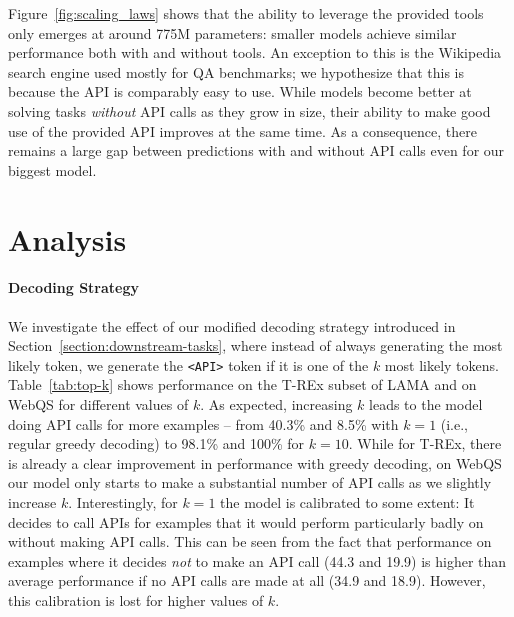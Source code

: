 \documentclass[11pt]{article}
\begin{document}
\begin{CJK*}{UTF8}{gbsn}
Figure~\ref{fig:scaling_laws} shows that the ability to leverage the provided tools only emerges at around 775M parameters: smaller models achieve similar performance both with and without tools. An exception to this is the Wikipedia search engine used mostly for QA benchmarks; we hypothesize that this is because the API is comparably easy to use.
While models become better at solving tasks \emph{without} API calls as they grow in size, their ability to make good use of the provided API improves at the same time. As a consequence, there remains a large gap between predictions with and without API calls even for our biggest model.

\section{Analysis}
\label{section:analysis}

\paragraph{Decoding Strategy}

We investigate the effect of our modified decoding strategy introduced in Section~\ref{section:downstream-tasks}, where instead of always generating the most likely token, we generate the \texttt{<API>} token if it is one of the $k$ most likely tokens. Table~\ref{tab:top-k} shows performance on the T-REx subset of LAMA and on WebQS for different values of $k$. As expected, increasing $k$ leads to the model doing API calls for more examples -- from 40.3\% and 8.5\% with $k = 1$ (i.e., regular greedy decoding) to 98.1\% and 100\% for $k = 10$. While for T-REx, there is already a clear improvement in performance with greedy decoding, on WebQS our model only starts to make a substantial number of API calls as we slightly increase $k$. Interestingly, for $k = 1$ the model is calibrated to some extent: It decides to call APIs for examples that it would perform particularly badly on without making API calls. This can be seen from the fact that performance on examples where it decides \emph{not} to make an API call (44.3 and 19.9) is higher than average performance if no API calls are made at all (34.9 and 18.9). However, this calibration is lost for higher values of $k$.


\end{CJK*}
\end{document}
